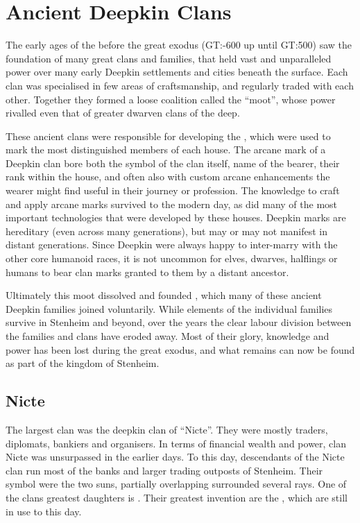 \section{Ancient Deepkin Clans}
\label{sec:Deepkin Clans}

The early ages of the before the great exodus (GT:-600 up until GT:500) saw the
foundation of many great  clans and families, that held
vast and unparalleled power over many early Deepkin settlements and cities
beneath the surface. Each clan was specialised in few areas of craftsmanship,
and regularly traded with each other. Together they formed a loose coalition
called the ``moot'', whose power rivalled even that of greater dwarven clans
of the deep.

These ancient clans were responsible for developing the , which were used to mark the most distinguished members of each house.
The arcane mark of a Deepkin clan bore both the symbol of the clan itself,
name of the bearer, their rank within the house, and often also with custom
arcane enhancements the wearer might find useful in their journey or
profession. The knowledge to craft and apply arcane marks survived to the
modern day, as did many of the most important technologies that were developed
by these houses. Deepkin marks are hereditary (even across many generations),
but may or may not manifest in distant generations. Since Deepkin were always
happy to inter-marry with the other core humanoid races, it is not uncommon
for elves, dwarves, halflings or humans to bear clan marks granted to them by
a distant ancestor.

Ultimately this moot dissolved and founded , which many
of these ancient Deepkin families joined voluntarily. While elements of the
individual families survive in Stenheim and beyond, over the years the clear
labour division between the families and clans have eroded away. Most of their
glory, knowledge and power has been lost during the great exodus, and what
remains can now be found as part of the kingdom of Stenheim.

\subsection{Nicte}
\label{sec:Nicte}
The largest clan was the deepkin clan of ``Nicte''. They were mostly traders,
diplomats, bankiers and organisers. In terms of financial wealth and power,
clan Nicte was unsurpassed in the earlier days. To this day, descendants of
the Nicte clan run most of the banks and larger trading outposts of Stenheim.
Their symbol were the two suns, partially overlapping surrounded several rays.
One of the clans greatest daughters is . Their greatest
invention are the , which are still in use to this
day.

